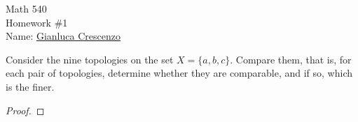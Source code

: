 \documentclass[12pt,twoside,openany]{memoir}
\begin{document}
\begin{center}
    {\Large Math 540 \\[0.1in]Homework \#1}\\[.175in]
    {Name:} {\underline{Gianluca Crescenzo\hspace*{2in}}}\\[0.15in]
    \end{center}
    \vspace{4pt}
\begin{exercise}
    Consider the nine topologies on the set $X = \{a,b,c\}$. Compare them, that is, for each pair of topologies, determine whether they are comparable, and if so, which is the finer.
\end{exercise}
\begin{proof}
    
\end{proof}
\end{document}
